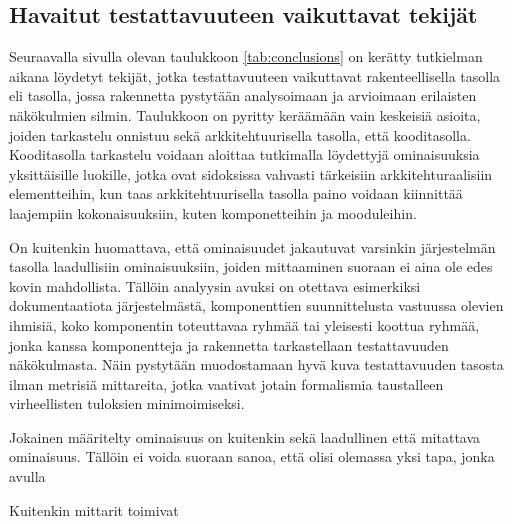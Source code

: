 \documentclass[finnish]{tktltiki2}
\numberwithin{table}{section}
\theoremstyle{definition}
\theoremstyle{remark}
\begin{document}


\subsection{Havaitut testattavuuteen vaikuttavat tekijät}

Seuraavalla sivulla olevan taulukkoon \ref{tab:conclusions} on kerätty tutkielman aikana löydetyt tekijät, jotka testattavuuteen vaikuttavat rakenteellisella tasolla eli tasolla, jossa rakennetta pystytään analysoimaan ja arvioimaan erilaisten näkökulmien silmin. Taulukkoon on pyritty keräämään vain keskeisiä asioita, joiden tarkastelu onnistuu sekä arkkitehtuurisella tasolla, että kooditasolla. Kooditasolla tarkastelu voidaan aloittaa tutkimalla löydettyjä ominaisuuksia yksittäisille luokille, jotka ovat sidoksissa vahvasti tärkeisiin arkkitehturaalisiin elementteihin, kun taas arkkitehtuurisella tasolla paino voidaan kiinnittää laajempiin kokonaisuuksiin, kuten komponetteihin ja mooduleihin.  

On kuitenkin huomattava, että ominaisuudet jakautuvat varsinkin järjestelmän tasolla laadullisiin ominaisuuksiin, joiden mittaaminen suoraan ei aina ole edes kovin mahdollista. Tällöin analyysin avuksi on otettava esimerkiksi dokumentaatiota järjestelmästä, komponenttien suunnittelusta vastuussa olevien ihmisiä, koko komponentin toteuttavaa ryhmää tai yleisesti koottua ryhmää, jonka kanssa komponentteja ja rakennetta tarkastellaan testattavuuden näkökulmasta. Näin pystytään muodostamaan hyvä kuva testattavuuden tasosta ilman metrisiä mittareita, jotka vaativat jotain formalismia taustalleen virheellisten tuloksien minimoimiseksi.

Jokainen määritelty ominaisuus on kuitenkin sekä laadullinen että mitattava ominaisuus. Tällöin ei voida suoraan sanoa, että olisi olemassa yksi tapa, jonka avulla 

Kuitenkin mittarit toimivat
\end{document}
